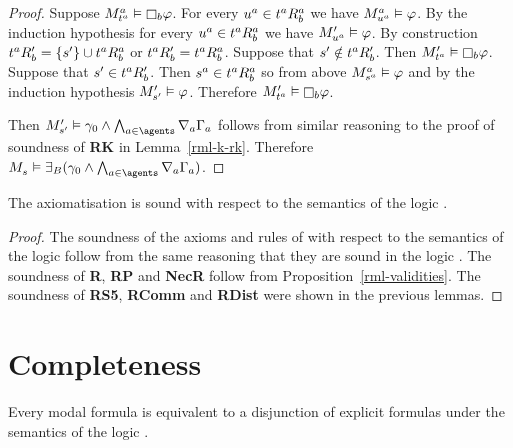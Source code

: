 \begin{proof}
Suppose $\kPModel[\agentA]{\kStateT[\agentA]} \entails \necessaryB \phi$.
For every $\kStateU[\agentA] \in \kSuccessorsB[\agentA]{\kStateT[\agentA]}$ we have $\kPModel[\agentA]{\kStateU[\agentA]} \entails \phi$.
By the induction hypothesis for every $\kStateU[\agentA] \in \kSuccessorsB[\agentA]{\kStateT[\agentA]}$ we have $\kPModelP{\kStateU[\agentA]} \entails \phi$.
By construction $\kSuccessorsPB{\kStateT[\agentA]} = \{\kStateSP\} \cup \kSuccessorsB[\agentA]{\kStateT[\agentA]}$ or $\kSuccessorsPB{\kStateT[\agentA]} = \kSuccessorsB[\agentA]{\kStateT[\agentA]}$.
Suppose that $\kStateSP \notin \kSuccessorsPB{\kStateT[\agentA]}$.
Then $\kPModelP{\kStateT[\agentA]} \entails \necessaryB \phi$.
Suppose that $\kStateSP \in \kSuccessorsPB{\kStateT[\agentA]}$.
Then $\kStateS[\agentA] \in \kSuccessorsB[\agentA]{\kStateT[\agentA]}$ so from above $\kPModel[\agentA]{\kStateS[\agentA]} \entails \phi$ and by the induction hypothesis $\kPModelP{\kStateSP} \entails \phi$.
Therefore $\kPModelP{\kStateT[\agentA]} \entails \necessaryB \phi$.

Then $\kPModelP{\kStateSP} \entails \gamma_0 \land \bigwedge_{\agentA \in \agents} \coversA \Gamma_\agentA$ follows from similar reasoning to the proof of soundness of {\bf RK} in Lemma~\ref{rml-k-rk}.
Therefore $\kPModel{\kStateS} \entails \somerefsBs (\gamma_0 \land \bigwedge_{\agentA \in \agents} \coversA \Gamma_\agentA)$.
\end{proof}

\begin{lemma}\label{rml-s5-soundness}
The axiomatisation \axiomRmlS{} is sound with respect to the semantics of the logic \logicRmlS{}.
\end{lemma}

\begin{proof}
The soundness of the axioms and rules of \axiomS{} with respect to the semantics of the logic \logicRmlS{} follow from the same reasoning that they are sound in the logic \logicS{}.
The soundness of {\bf R}, {\bf RP} and {\bf NecR} follow from Proposition~\ref{rml-validities}.
The soundness of {\bf RS5}, {\bf RComm} and {\bf RDist} were shown in the previous lemmas.
\end{proof}

\section{Completeness}\label{rml-s5-completeness}

\begin{lemma}
Every modal formula is equivalent to a disjunction of explicit formulas under the semantics of the logic \logicS{}.
\end{lemma}

